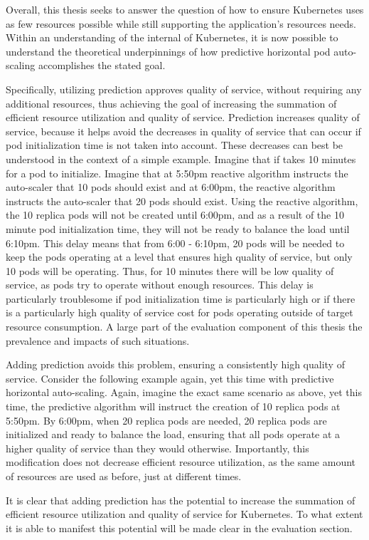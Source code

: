 Overall, this thesis seeks to answer the question of how to ensure Kubernetes
uses as few resources possible while still supporting the application's
resources needs. Within an understanding of the internal of Kubernetes, it is now
possible to understand the theoretical underpinnings of how predictive
horizontal pod auto-scaling accomplishes the stated goal.

Specifically, utilizing prediction approves quality of service, without
requiring any additional resources, thus achieving the goal of increasing the
summation of efficient resource utilization and quality of service. Prediction
increases quality of service, because it helps avoid the decreases in quality of
service that can occur if pod initialization time is not taken into account.
These decreases can best be understood in the context of a simple example.
Imagine that if takes 10 minutes for a pod to initialize. Imagine that at 5:50pm
reactive algorithm instructs the auto-scaler that 10 pods should exist and at
6:00pm, the reactive algorithm instructs the auto-scaler that 20 pods should
exist. Using the reactive algorithm, the 10 replica pods will not be created
until 6:00pm, and as a result of the 10 minute pod initialization time, they
will not be ready to balance the load until 6:10pm. This delay means that from
6:00 - 6:10pm, 20 pods will be needed to keep the pods operating at a level that
ensures high quality of service, but only 10 pods will be operating. Thus, for
10 minutes there will be low quality of service, as pods try to operate without
enough resources. This delay is particularly troublesome if pod initialization
time is particularly high or if there is a particularly high quality of service
cost for pods operating outside of target resource consumption. A large part of
the evaluation component of this thesis the prevalence and impacts of such
situations.

Adding prediction avoids this problem, ensuring a consistently high quality of
service. Consider the following example again, yet this time with predictive
horizontal auto-scaling. Again, imagine the exact same scenario as above, yet
this time, the predictive algorithm will instruct the creation of 10 replica
pods at 5:50pm. By 6:00pm, when 20 replica pods are needed, 20 replica pods are
initialized and ready to balance the load, ensuring that all pods operate at a
higher quality of service than they would otherwise. Importantly, this
modification does not decrease efficient resource utilization, as the same
amount of resources are used as before, just at different times.

It is clear that adding prediction has the potential to increase the summation
of efficient resource utilization and quality of service for Kubernetes. To what
extent it is able to manifest this potential will be made clear in the
evaluation section.
